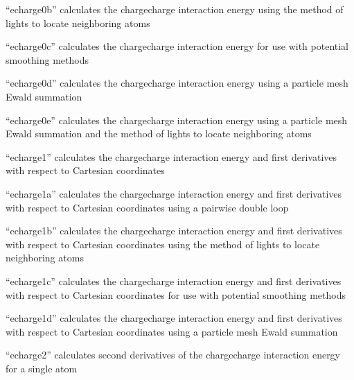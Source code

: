 \documentclass[letterpaper,11pt,english]{sphinxmanual}
\begin{document}
“echarge0b” calculates the charge\sphinxhyphen{}charge interaction energy using the method of lights to locate neighboring atoms


“echarge0c” calculates the charge\sphinxhyphen{}charge interaction energy for use with potential smoothing methods


“echarge0d” calculates the charge\sphinxhyphen{}charge interaction energy using a particle mesh Ewald summation


“echarge0e” calculates the charge\sphinxhyphen{}charge interaction energy using a particle mesh Ewald summation and the method of lights to locate neighboring atoms


“echarge1” calculates the charge\sphinxhyphen{}charge interaction energy and first derivatives with respect to Cartesian coordinates


“echarge1a” calculates the charge\sphinxhyphen{}charge interaction energy and first derivatives with respect to Cartesian coordinates using a pairwise double loop


“echarge1b” calculates the charge\sphinxhyphen{}charge interaction energy and first derivatives with respect to Cartesian coordinates using the method of lights to locate neighboring atoms


“echarge1c” calculates the charge\sphinxhyphen{}charge interaction energy and first derivatives with respect to Cartesian coordinates for use with potential smoothing methods


“echarge1d” calculates the charge\sphinxhyphen{}charge interaction energy and first derivatives with respect to Cartesian coordinates using a particle mesh Ewald summation


“echarge2” calculates second derivatives of the charge\sphinxhyphen{}charge interaction energy for a single atom
\end{document}
